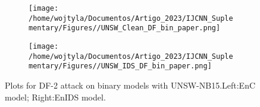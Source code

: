 \documentclass[conference]{IEEEtran}
\begin{document}
	\begin{figure}[H]
		\centering
		\begin{subfigure}[b]{0.45\textwidth}
			\texttt{[image: /home/wojtyla/Documentos/Artigo\_2023/IJCNN\_Suplementary/Figures//UNSW\_Clean\_DF\_bin\_paper.png]}
			\label{fig:1}
		\end{subfigure}
		\hfill
		\begin{subfigure}[b]{0.45\textwidth}
			\texttt{[image: /home/wojtyla/Documentos/Artigo\_2023/IJCNN\_Suplementary/Figures//UNSW\_IDS\_DF\_bin\_paper.png]}
			\label{fig:4}
		\end{subfigure}
		\caption{Plots for DF-2 attack on binary models with UNSW-NB15.Left:EnC model; Right:EnIDS model.}
		\label{fig:unsw_df_bin}
	\end{figure}
	
	
	
\end{document}
